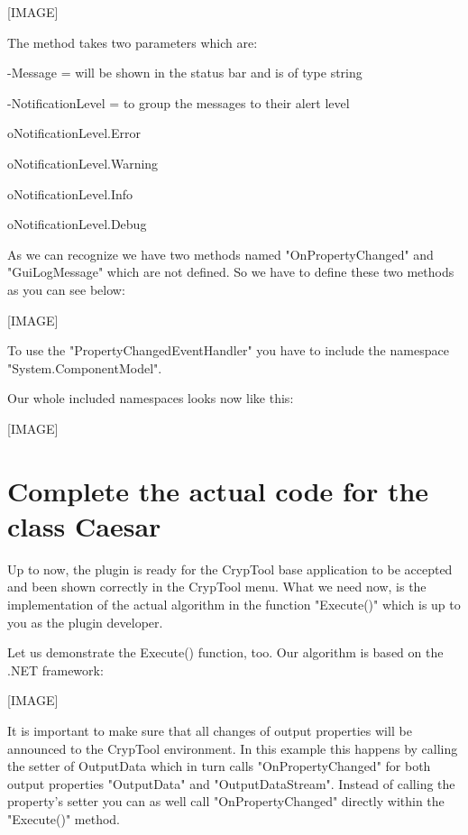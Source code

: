 [IMAGE]

The method takes two parameters which are:

\hspace{20pt}-Message = will be shown in the status bar and is of type string

\hspace{20pt}-NotificationLevel = to group the messages to their alert level

\hspace{30pt}o\hspace{10pt}NotificationLevel.Error

\hspace{30pt}o\hspace{10pt}NotificationLevel.Warning

\hspace{30pt}o\hspace{10pt}NotificationLevel.Info

\hspace{30pt}o\hspace{10pt}NotificationLevel.Debug

As we can recognize we have two methods named "OnPropertyChanged" and "GuiLogMessage" which are not defined. So we have to define these two methods as you can see below:

[IMAGE]

To use the "PropertyChangedEventHandler" you have to include the namespace "System.ComponentModel".

Our whole included namespaces looks now like this:

[IMAGE]


\section{Complete the actual code for the class Caesar}\label{sec:CompleteTheActualCodeForTheClassMD5}
Up to now, the plugin is ready for the CrypTool base application to be accepted and been shown correctly in the CrypTool menu. What we need now, is the implementation of the actual algorithm in the function "Execute()" which is up to you as the plugin developer.

Let us demonstrate the Execute() function, too. Our algorithm is based on the .NET framework:

[IMAGE]

It is important to make sure that all changes of output properties will be announced to the CrypTool environment. In this example this happens by calling the setter of OutputData which in turn calls "OnPropertyChanged" for both output properties "OutputData" and "OutputDataStream". Instead of calling the property's setter you can as well call "OnPropertyChanged" directly within the "Execute()" method.

